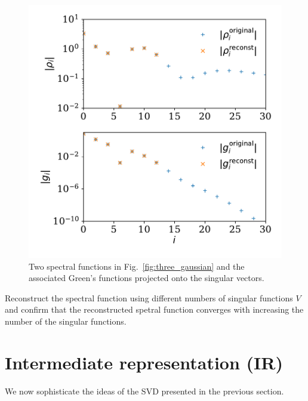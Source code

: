 \documentclass[submission, LectureNotes]{SciPost}
\begin{document}
\begin{figure}
    \centering
    \includegraphics[width=0.6\columnwidth]{gi_rhoi.pdf}
    \caption{
      Two spectral functions in Fig.~\ref{fig:three_gaussian}
      and the associated Green's functions projected onto the singular vectors.
      }
    \label{fig:gi_rhoi}
\end{figure}


\begin{Exercise}
    Reconstruct the spectral function using different numbers of singular
    functions $V$ and confirm that the reconstructed spetral function converges 
    with increasing the number of the singular functions.
\end{Exercise}



\section{Intermediate representation (IR)}
We now sophisticate the ideas of the SVD presented in the previous section.
\end{document}

